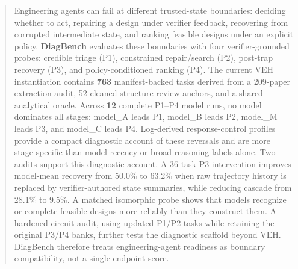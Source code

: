 \begin{abstract}
Engineering agents can fail at different trusted-state boundaries: deciding whether to act, repairing a design under verifier feedback, recovering from corrupted intermediate state, and ranking feasible designs under an explicit policy. \textbf{DiagBench} evaluates these boundaries with four verifier-grounded probes: credible triage (P1), constrained repair/search (P2), post-trap recovery (P3), and policy-conditioned ranking (P4).
The current VEH instantiation contains \textbf{763} manifest-backed tasks derived from a 209-paper extraction audit, 52 cleaned structure-review anchors, and a shared analytical oracle. Across \textbf{12} complete P1--P4 model runs, no model dominates all stages: model_A leads P1, model_B leads P2, model_M leads P3, and model_C leads P4. Log-derived response-control profiles provide a compact diagnostic account of these reversals and are more stage-specific than model recency or broad reasoning labels alone.
Two audits support this diagnostic account. A 36-task P3 intervention improves model-mean recovery from 50.0\% to 63.2\% when raw trajectory history is replaced by verifier-authored state summaries, while reducing cascade from 28.1\% to 9.5\%. A matched isomorphic probe shows that models recognize or complete feasible designs more reliably than they construct them. A hardened circuit audit, using updated P1/P2 tasks while retaining the original P3/P4 banks, further tests the diagnostic scaffold beyond VEH. DiagBench therefore treats engineering-agent readiness as boundary compatibility, not a single endpoint score.
\end{abstract}
